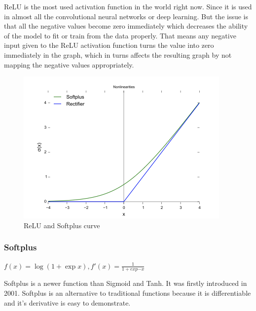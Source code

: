 \documentclass[11pt,a4paper]{article}
\begin{document}
ReLU is the most used activation function in the world right now. Since it is used in almost all the convolutional neural networks or deep learning. But the issue is that all the negative values become zero immediately which decreases the ability of the model to fit or train from the data properly. That means any negative input given to the ReLU activation function turns the value into zero immediately in the graph, which in turns affects the resulting graph by not mapping the negative values appropriately.
\begin{figure}[htb]
\begin{center}
\includegraphics[width=\columnwidth]{Rectifier_and_softplus_functions.png}
\end{center}
\caption{ReLU and Softplus curve }
\label{fig:figure4}
\end{figure}

\subsubsection{Softplus}
$f(x)= \log(1+\exp{x}), f'(x) = \frac{1}{1+exp{-x}}$

Softplus is a newer function than Sigmoid and Tanh. It was firstly introduced in 2001. Softplus is an alternative to traditional functions because it is differentiable and it's derivative is easy to demonstrate.
\end{document}
